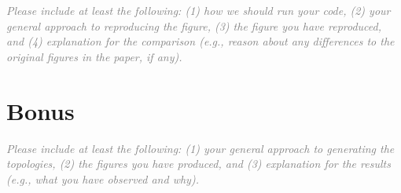 \documentclass[a4paper,11pt]{article}
\newcommand{\note}[1]{\textit{\textcolor{gray}{#1}}}
\begin{document}
\note{Please include at least the following: (1) how we should run your code, (2) your general approach to reproducing the figure, (3) the figure you have reproduced, and (4) explanation for the comparison (e.g., reason about any differences to the original figures in the paper, if any).}


\section{Bonus}

\note{Please include at least the following: (1) your general approach to generating the topologies, (2) the figures you have produced, and (3) explanation for the results (e.g., what you have observed and why).}
\end{document}
